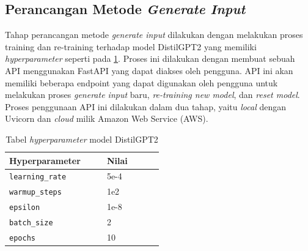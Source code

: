 


  \subsection{Perancangan Metode \emph{Generate Input}}
  \label{subsec:perancanganmetodegenerateinput}

Tahap perancangan metode \emph{generate input} dilakukan dengan 
melakukan proses training dan re-training terhadap model DistilGPT2 
yang memiliki \emph{hyperparameter} seperti pada \ref{tab:hyperparameter}. 
Proses ini dilakukan dengan membuat sebuah API menggunakan FastAPI 
yang dapat diakses oleh pengguna. API ini akan memiliki beberapa 
endpoint yang dapat digunakan oleh pengguna untuk melakukan proses 
\emph{generate input} baru, \emph{re-training new model}, dan \emph{reset model}. 
Proses penggunaan API ini dilakukan dalam dua tahap, yaitu \emph{local} dengan 
Uvicorn 
dan \emph{cloud} milik Amazon Web Service (AWS). 


\begin{table}[H]
  \centering
  \caption{Tabel \emph{hyperparameter} model DistilGPT2}
  \begin{tabular}{|p{0.25\linewidth}|p{0.25\linewidth}|}
    \hline
    \textbf{Hyperparameter} & \textbf{Nilai} \\
    \hline
    \raggedright \texttt{learning\_rate} & 5e-4 \\
    \hline
    \raggedright \texttt{warmup\_steps} & 1e2 \\
    \hline
    \raggedright \texttt{epsilon} & 1e-8 \\
    \hline
    \raggedright \texttt{batch\_size} & 2 \\
    \hline
    \raggedright \texttt{epochs} & 10 \\
    \hline
  \end{tabular}
  
  \label{tab:hyperparameter}
\end{table}


